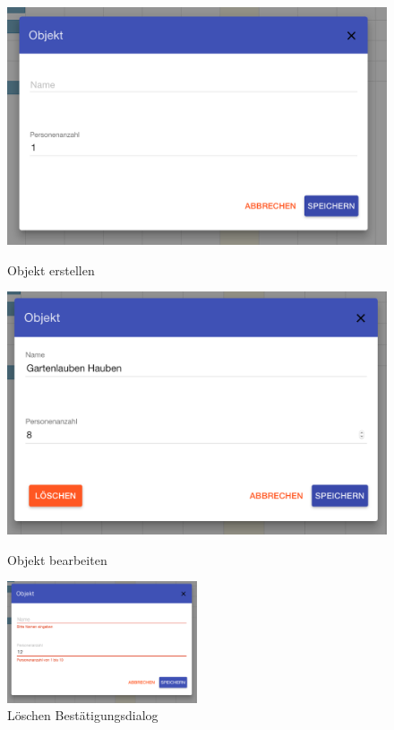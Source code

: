\begin{figure}[H]
    \centering
    \begin{minipage}[t]{0.49\linewidth}
        \centering
        \includegraphics[width=\linewidth]{images/frontend_resource_new.png}
        \label{frontend_resource_new}
        \caption{Objekt erstellen}
    \end{minipage}%
    \hfill
    \begin{minipage}[t]{0.49\linewidth}
        \centering
        \includegraphics[width=\linewidth]{images/frontend_resource_edit.png}
        \label{frontend_resource_edit}
        \caption{Objekt bearbeiten}
    \end{minipage}
\end{figure}

\begin{figure}[H]
\centering\includegraphics[width=0.5\textwidth]{images/frontend_resource_fail.png}
\caption{Löschen Bestätigungsdialog}
\label{frontend_resource_fail}
\end{figure}

